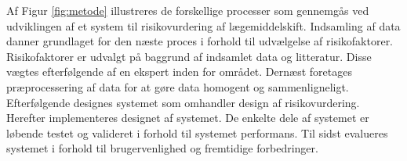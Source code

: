 Af Figur \ref{fig:metode} illustreres de forskellige processer som gennemgås ved udviklingen af et system til risikovurdering af lægemiddelskift. Indsamling af data danner grundlaget for den næste proces i forhold til udvælgelse af risikofaktorer. Risikofaktorer er udvalgt på baggrund af indsamlet data og litteratur. Disse vægtes efterfølgende af en ekspert inden for området. Dernæst foretages præprocessering af data for at gøre data homogent og sammenligneligt. Efterfølgende designes systemet som omhandler design af risikovurdering. Herefter implementeres designet af systemet. De enkelte dele af systemet er løbende testet og valideret i forhold til systemet performans. Til sidst evalueres systemet i forhold til brugervenlighed og fremtidige forbedringer. 




